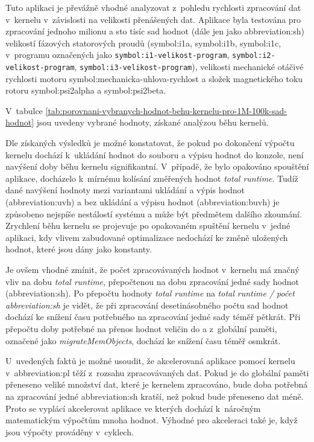 \documentclass[a4paper, twoside, 11pt]{article}
\begin{document}
		Tuto aplikaci je převážně vhodné analyzovat z~pohledu rychlosti zpracování dat v~kernelu v~závislosti na velikosti přenášených dat. Aplikace byla testována pro zpracování jednoho milionu a sto tisíc sad hodnot (dále jen jako \gls{abbreviation:sh}) velikostí fázových statorových proudů (\gls{symbol:i1a}, \gls{symbol:i1b}, \gls{symbol:i1c}, v~programu označených jako \texttt{\gls{symbol:i1-velikost-program}}, \texttt{\gls{symbol:i2-velikost-program}}, \texttt{\gls{symbol:i3-velikost-program}}), velikosti mechanické otáčivé rychlosti motoru \gls{symbol:mechanicka-uhlova-rychlost} a složek magnetického toku rotoru \gls{symbol:psi2alpha} a \gls{symbol:psi2beta}.\par
		V~tabulce \ref{tab:porovnani-vybranych-hodnot-behu-kernelu-pro-1M-100k-sad-hodnot} jsou uvedeny vybrané hodnoty, získané analýzou běhu kernelů.\par
		Dle získaných výsledků je možné konstatovat, že pokud po dokončení výpočtu kernelu dochází k~ukládání hodnot do souboru a výpisu hodnot do konzole, není navýšení doby běhu kernelu signifikantní. V~případě, že bylo opakováno spouštění aplikace, docházelo k~mírnému kolísání změřených hodnot \textit{total runtime}. Tudíž dané navýšení hodnoty mezi variantami ukládání a výpis hodnot (\gls{abbreviation:uvh}) a bez ukládání a výpisu hodnot (\gls{abbreviation:buvh}) je způsobeno nejspíše nestálostí systému a může být předmětem dalšího zkoumání. Zrychlení běhu kernelu se projevuje po opakovaném spuštění kernelu v~jedné aplikaci, kdy vlivem zabudované optimalizace nedochází ke změně uložených hodnot, které jsou dány jako konstanty.\par
		Je ovšem vhodné zmínit, že počet zpracovávaných hodnot v~kernelu má značný vliv na dobu \textit{total runtime}, přepočtenou na dobu zpracování jedné sady hodnot (\gls{abbreviation:sh}). Po přepočtu hodnoty \textit{total runtime} na \textit{total runtime / počet \gls{abbreviation:sh}} je vidět, že při zpracování desetinásobného počtu sad hodnot dochází ke snížení času potřebného na zpracování jedné sady téměř pětkrát. Při přepočtu doby potřebné na přenos hodnot veličin do a z~globální paměti, označené jako \textit{migrateMemObjects}, dochází ke snížení času téměř osmkrát.\par
		U~uvedených faktů je možné usoudit, že akcelerovaná aplikace pomocí kernelu v~\gls{abbreviation:pl} těží z~rozsahu zpracovávaných dat. Pokud je do globální paměti přeneseno veliké množství dat, které je kernelem zpracováno, bude doba potřebná na zpracování jedné \gls{abbreviation:sh} kratší, než pokud bude přeneseno dat méně. Proto se vyplácí akcelerovat aplikace ve kterých dochází k~náročným matematickým výpočtům mnoha hodnot. Výhodné pro akceleraci také je, když jsou výpočty prováděny v~cyklech.\par
\end{document}
